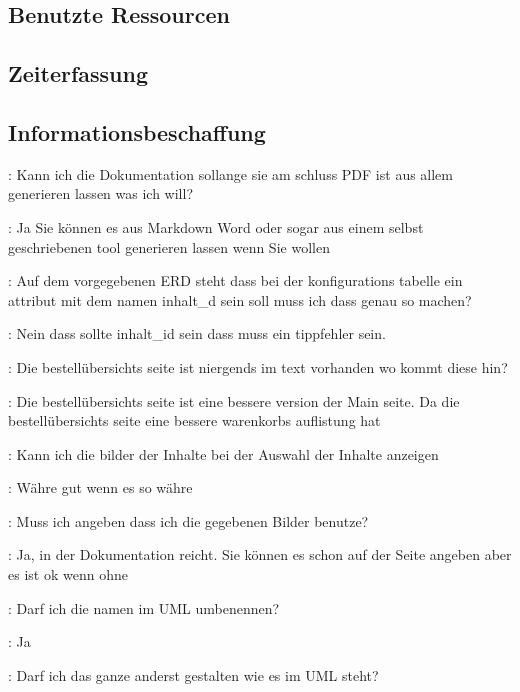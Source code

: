 \documentclass[a4paper, 11pt]{article}
\begin{document}
\subsection{Benutzte Ressourcen}

\subsection{Zeiterfassung}

\subsection{Informationsbeschaffung}

\begin{drama}

\msspeaks: Kann ich die Dokumentation sollange sie am schluss PDF ist aus allem generieren lassen was ich will?

\dozentspeaks: Ja Sie können es aus Markdown Word oder sogar aus einem selbst geschriebenen tool generieren lassen wenn Sie wollen

\msspeaks: Auf dem vorgegebenen ERD steht dass bei der konfigurations tabelle ein attribut mit dem namen inhalt\_d sein soll muss ich dass genau so machen?

\dozentspeaks: Nein dass sollte inhalt\_id sein dass muss ein tippfehler sein.

\msspeaks: Die bestellübersichts seite ist niergends im text vorhanden wo kommt diese hin?

\dozentspeaks: Die bestellübersichts seite ist eine bessere version der Main seite. Da die bestellübersichts seite eine bessere warenkorbs auflistung hat

\msspeaks: Kann ich die bilder der Inhalte bei der Auswahl der Inhalte anzeigen

\dozentspeaks: Währe gut wenn es so währe

\msspeaks: Muss ich angeben dass ich die gegebenen Bilder benutze?

\dozentspeaks: Ja, in der Dokumentation reicht. Sie können es schon auf der Seite angeben aber es ist ok wenn ohne

\msspeaks: Darf ich die namen im UML umbenennen?

\dozentspeaks: Ja

\msspeaks: Darf ich das ganze anderst gestalten wie es im UML steht?


\end{drama}
\end{document}
